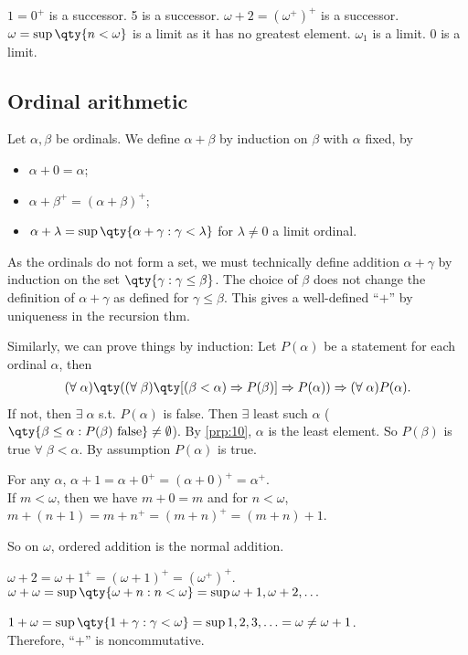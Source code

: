\begin{example}
    $1 = 0^+$ is a successor.
    5 is a successor.
    $\omega + 2 = (\omega^+)^+$ is a successor.
    $\omega = \sup \qty{n < \omega}$ is a limit as it has no greatest element.
    $\omega_1$ is a limit.
    0 is a limit.
\end{example}

\subsection{Ordinal arithmetic}
Let $\alpha, \beta$ be ordinals.
We define $\alpha + \beta$ by induction on $\beta$ with $\alpha$ fixed, by
\begin{itemize}
    \item $\alpha + 0 = \alpha$;
    \item $\alpha + \beta^+ = (\alpha + \beta)^+$;
    \item $\alpha + \lambda = \sup\qty{\alpha + \gamma : \gamma < \lambda}$ for $\lambda \neq 0$ a limit ordinal.
\end{itemize}

\begin{remark}
    As the ordinals do not form a set, we must technically define addition $\alpha + \gamma$ by induction on the set $\qty{\gamma : \gamma \leq \beta}$.
    The choice of $\beta$ does not change the definition of $\alpha + \gamma$ as defined for $\gamma \leq \beta$.
    This gives a well-defined ``$+$'' by uniqueness in the recursion thm.

    Similarly, we can prove things by induction:
    Let $P(\alpha)$ be a statement for each ordinal $\alpha$, then
    \begin{align*}
        (\forall \; \alpha) \qty((\forall \; \beta) \qty[(\beta < \alpha) \implies P(\beta)] \implies P(\alpha)) \implies (\forall \; \alpha) P(\alpha).
    \end{align*}
    If not, then $\exists \; \alpha$ s.t. $P(\alpha)$ is false.
    Then $\exists$ least such $\alpha$ ($\qty{\beta \leq \alpha : P(\beta) \text{ false}} \neq \emptyset$).
    By \cref{prp:10}, $\alpha$ is the least element.
    So $P(\beta)$ is true $\forall \; \beta < \alpha$.
    By assumption $P(\alpha)$ is true.
\end{remark}

\begin{example}
    For any $\alpha$, $\alpha + 1 = \alpha + 0^+ = (\alpha + 0)^+ = \alpha^+$. \\
    If $m < \omega$, then we have $m + 0 = m$ and for $n < \omega$, $m + (n + 1) = m + n^+ = (m + n)^+ = (m+n) + 1$.

    So on $\omega$, ordered addition is the normal addition.

    $\omega + 2 = \omega + 1^+ = (\omega + 1)^+ = (\omega^+)^+$. \\
    $\omega + \omega = \sup \qty{\omega + n : n < \omega} = \sup{\omega + 1, \omega + 2, \dots}$

    $1 + \omega = \sup\qty{1 + \gamma : \gamma < \omega} = \sup{1, 2, 3, \dots} = \omega \neq \omega + 1$. \\
    Therefore, ``$+$'' is noncommutative.
\end{example}


